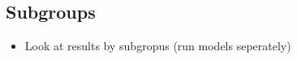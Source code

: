\subsection{Subgroups}%
\label{sub:subgroups}

\begin{itemize}
    \item Look at results by subgropus (run models seperately)
\end{itemize}







